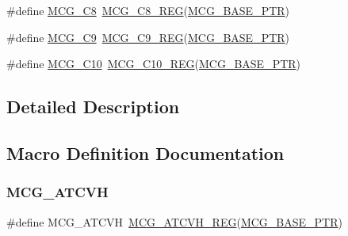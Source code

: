 \begin{DoxyCompactItemize}
\item 
\#define \hyperlink{group___m_c_g___register___accessor___macros_ga4328cf0c21c1c85cc0d618f7762016b8}{M\+C\+G\+\_\+\+C8}~\hyperlink{group___m_c_g___register___accessor___macros_ga9d7e2b88a408a722f0b7f64a7a32af01}{M\+C\+G\+\_\+\+C8\+\_\+\+R\+EG}(\hyperlink{group___m_c_g___peripheral_gaceefc72e93a47a35f59a31c57dddf41b}{M\+C\+G\+\_\+\+B\+A\+S\+E\+\_\+\+P\+TR})
\item 
\#define \hyperlink{group___m_c_g___register___accessor___macros_ga40ae99ab2fbda74612a8f3f6bab361e0}{M\+C\+G\+\_\+\+C9}~\hyperlink{group___m_c_g___register___accessor___macros_ga4edaa0cc446f810f9aa01a41f6960573}{M\+C\+G\+\_\+\+C9\+\_\+\+R\+EG}(\hyperlink{group___m_c_g___peripheral_gaceefc72e93a47a35f59a31c57dddf41b}{M\+C\+G\+\_\+\+B\+A\+S\+E\+\_\+\+P\+TR})
\item 
\#define \hyperlink{group___m_c_g___register___accessor___macros_gab582a1281f6376c0dd52e62c3e22653e}{M\+C\+G\+\_\+\+C10}~\hyperlink{group___m_c_g___register___accessor___macros_gaf22ce39beaaebd71b3d675a11ed7fb0b}{M\+C\+G\+\_\+\+C10\+\_\+\+R\+EG}(\hyperlink{group___m_c_g___peripheral_gaceefc72e93a47a35f59a31c57dddf41b}{M\+C\+G\+\_\+\+B\+A\+S\+E\+\_\+\+P\+TR})
\end{DoxyCompactItemize}


\subsection{Detailed Description}


\subsection{Macro Definition Documentation}
\mbox{\label{group___m_c_g___register___accessor___macros_ga1cb18ffdb73d4eaad4573563aec49be0}} 
\subsubsection{\texorpdfstring{M\+C\+G\+\_\+\+A\+T\+C\+VH}{MCG\_ATCVH}}
{\footnotesize\ttfamily \#define M\+C\+G\+\_\+\+A\+T\+C\+VH~\hyperlink{group___m_c_g___register___accessor___macros_gaca17ff8b94752a7700acc7adc7e462ea}{M\+C\+G\+\_\+\+A\+T\+C\+V\+H\+\_\+\+R\+EG}(\hyperlink{group___m_c_g___peripheral_gaceefc72e93a47a35f59a31c57dddf41b}{M\+C\+G\+\_\+\+B\+A\+S\+E\+\_\+\+P\+TR})}

